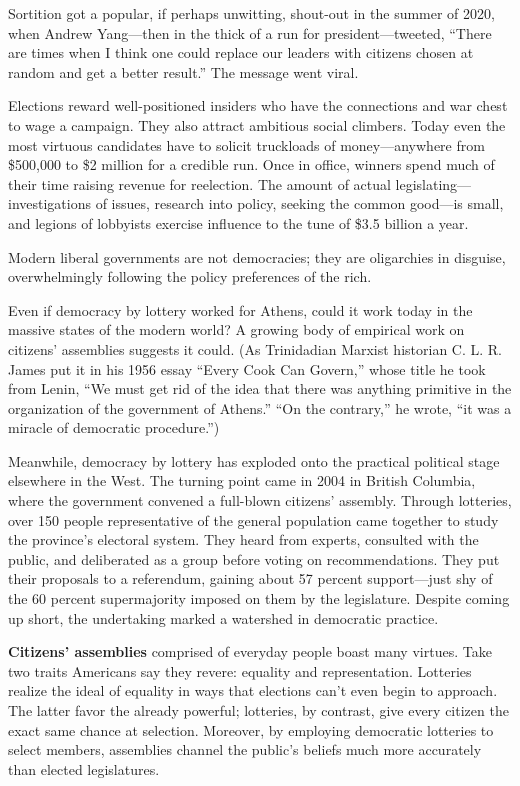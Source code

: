\documentclass[
]{book}
\begin{document}
Sortition got a popular, if perhaps unwitting, shout-out in the summer of 2020, when Andrew Yang---then in the thick of a run for president---tweeted, ``There are times when I think one could replace our leaders with citizens chosen at random and get a better result.'' The message went viral.

Elections reward well-positioned insiders who have the connections and war chest to wage a campaign. They also attract ambitious social climbers. Today even the most virtuous candidates have to solicit truckloads of money---anywhere from \$500,000 to \$2 million for a credible run. Once in office, winners spend much of their time raising revenue for reelection. The amount of actual legislating---investigations of issues, research into policy, seeking the common good---is small, and legions of lobbyists exercise influence to the tune of \$3.5 billion a year.

Modern liberal governments are not democracies; they are oligarchies in disguise, overwhelmingly following the policy preferences of the rich.

Even if democracy by lottery worked for Athens, could it work today in the massive states of the modern world? A growing body of empirical work on citizens' assemblies suggests it could. (As Trinidadian Marxist historian C. L. R. James put it in his 1956 essay ``Every Cook Can Govern,'' whose title he took from Lenin, ``We must get rid of the idea that there was anything primitive in the organization of the government of Athens.'' ``On the contrary,'' he wrote, ``it was a miracle of democratic procedure.'')

Meanwhile, democracy by lottery has exploded onto the practical political stage elsewhere in the West. The turning point came in 2004 in British Columbia, where the government convened a full-blown citizens' assembly. Through lotteries, over 150 people representative of the general population came together to study the province's electoral system. They heard from experts, consulted with the public, and deliberated as a group before voting on recommendations. They put their proposals to a referendum, gaining about 57 percent support---just shy of the 60 percent supermajority imposed on them by the legislature. Despite coming up short, the undertaking marked a watershed in democratic practice.

\textbf{Citizens' assemblies} comprised of everyday people boast many virtues. Take two traits Americans say they revere: equality and representation. Lotteries realize the ideal of equality in ways that elections can't even begin to approach. The latter favor the already powerful; lotteries, by contrast, give every citizen the exact same chance at selection. Moreover, by employing democratic lotteries to select members, assemblies channel the public's beliefs much more accurately than elected legislatures.
\end{document}
